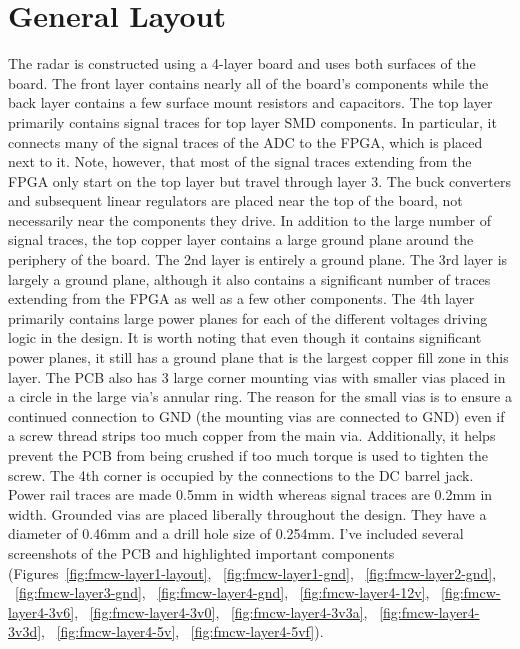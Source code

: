 \documentclass{default}
\begin{document}
\section{General Layout}

The radar is constructed using a 4-layer board and uses both surfaces of the board. The front layer
contains nearly all of the board's components while the back layer contains a few surface mount
resistors and capacitors. The top layer primarily contains signal traces for top layer SMD
components. In particular, it connects many of the signal traces of the ADC to the FPGA, which is
placed next to it. Note, however, that most of the signal traces extending from the FPGA only start
on the top layer but travel through layer 3. The buck converters and subsequent linear regulators
are placed near the top of the board, not necessarily near the components they drive. In addition to
the large number of signal traces, the top copper layer contains a large ground plane around the
periphery of the board. The 2nd layer is entirely a ground plane. The 3rd layer is largely a ground
plane, although it also contains a significant number of traces extending from the FPGA as well as a
few other components. The 4th layer primarily contains large power planes for each of the different
voltages driving logic in the design. It is worth noting that even though it contains significant
power planes, it still has a ground plane that is the largest copper fill zone in this layer. The
PCB also has 3 large corner mounting vias with smaller vias placed in a circle in the large via's
annular ring. The reason for the small vias is to ensure a continued connection to GND (the mounting
vias are connected to GND) even if a screw thread strips too much copper from the main
via. Additionally, it helps prevent the PCB from being crushed if too much torque is used to tighten
the screw. The 4th corner is occupied by the connections to the DC barrel jack. Power rail traces
are made 0.5mm in width whereas signal traces are 0.2mm in width. Grounded vias are placed liberally
throughout the design. They have a diameter of 0.46mm and a drill hole size of 0.254mm. I've
included several screenshots of the PCB and highlighted important components
(Figures~\ref{fig:fmcw-layer1-layout}, ~\ref{fig:fmcw-layer1-gnd}, ~\ref{fig:fmcw-layer2-gnd},
~\ref{fig:fmcw-layer3-gnd}, ~\ref{fig:fmcw-layer4-gnd}, ~\ref{fig:fmcw-layer4-12v},
~\ref{fig:fmcw-layer4-3v6}, ~\ref{fig:fmcw-layer4-3v0}, ~\ref{fig:fmcw-layer4-3v3a},
~\ref{fig:fmcw-layer4-3v3d}, ~\ref{fig:fmcw-layer4-5v}, ~\ref{fig:fmcw-layer4-5vf}).
\end{document}

